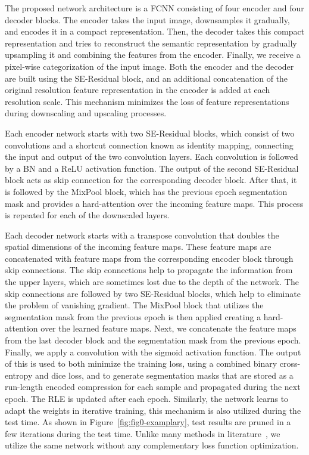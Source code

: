 \documentclass[journal]{IEEEtran}
\begin{document}
The proposed network architecture is a \ac{FCNN} consisting of four encoder and four decoder blocks. The encoder takes the input image, downsamples it gradually, and encodes it in a compact representation. Then, the decoder takes this compact representation and tries to reconstruct the semantic representation by gradually upsampling it and combining the features from the encoder. Finally,  we receive a pixel-wise categorization of the input image. Both the encoder and the decoder are built using the SE-Residual block, and an additional concatenation of the original resolution feature representation in the encoder is added at each resolution scale. This mechanism minimizes the loss of feature representations during downscaling and upscaling processes. 

Each encoder network starts with two SE-Residual blocks, which consist of two  convolutions and a shortcut connection known as identity mapping, connecting the input and output of the two convolution layers. Each convolution is followed by a \ac{BN} and a \ac{ReLU} activation function. The output of the second SE-Residual block acts as skip connection for the corresponding decoder block. After that, it is followed by the MixPool block, which has the previous epoch segmentation mask and provides a hard-attention over the incoming feature maps. This process is repeated for each of the downscaled layers. 

Each decoder network starts with a  transpose convolution that doubles the spatial dimensions of the incoming feature maps. These feature maps are concatenated with feature maps from the corresponding encoder block through skip connections. The skip connections help to propagate the information from the upper layers, which are sometimes lost due to the depth of the network. The skip connections are followed by two SE-Residual blocks, which help to eliminate the problem of vanishing gradient. The MixPool block that utilizes the segmentation mask from the previous epoch is then applied creating a hard-attention over the learned feature maps. Next, we concatenate the feature maps from the last decoder block and the segmentation mask from the previous epoch. Finally, we apply a  convolution with the sigmoid activation function. The output of this is used to both minimize the training loss, using a combined binary cross-entropy and dice loss, and to generate segmentation masks that are stored as a run-length encoded compression for each sample and propagated during the next epoch. The RLE is updated after each epoch. 
Similarly, the network learns to adapt the weights in iterative training, this mechanism is also utilized during the test time. As shown in Figure~\ref{fig:fig0-examplary}, test results are pruned in a few iterations during the test time. Unlike many methods in literature~\cite{mosinska2018beyond,Prashant:ECCV20}, we utilize the same network without any complementary loss function optimization. 
\end{document}
